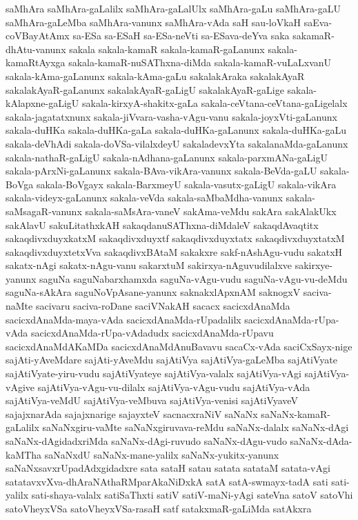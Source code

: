{saMhAra
saMhAra-gaLalilx
saMhAra-gaLalUlx
saMhAra-gaLu
saMhAra-gaLU
saMhAra-gaLeMba
saMhAra-vanunx
saMhAra-vAda
saH
sau-loVkaH
saEva-coVBayAtAmx
sa-ESa
sa-ESaH
sa-ESa-neVti
sa-ESava-deYva
saka
sakamaR-dhAtu-vanunx
sakala
sakala-kamaR
sakala-kamaR-gaLanunx
sakala-kamaRtAyxga
sakala-kamaR-nuSAThxna-diMda
sakala-kamaR-vuLaLxvanU
sakala-kAma-gaLanunx
sakala-kAma-gaLu
sakalakAraka
sakalakAyaR
sakalakAyaR-gaLanunx
sakalakAyaR-gaLigU
sakalakAyaR-gaLige
sakala-kAlapxne-gaLigU
sakala-kirxyA-shakitx-gaLa
sakala-ceVtana-ceVtana-gaLigelalx
sakala-jagatatxnunx
sakala-jiVvara-vasha-vAgu-vanu
sakala-joyxVti-gaLanunx
sakala-duHKa
sakala-duHKa-gaLa
sakala-duHKa-gaLanunx
sakala-duHKa-gaLu
sakala-deVhAdi
sakala-doVSa-vilalxdeyU
sakaladevxYta
sakalanaMda-gaLanunx
sakala-nathaR-gaLigU
sakala-nAdhana-gaLanunx
sakala-parxmANa-gaLigU
sakala-pArxNi-gaLanunx
sakala-BAva-vikAra-vanunx
sakala-BeVda-gaLU
sakala-BoVga
sakala-BoVgayx
sakala-BarxmeyU
sakala-vasutx-gaLigU
sakala-vikAra
sakala-videyx-gaLanunx
sakala-veVda
sakala-saMbaMdha-vanunx
sakala-saMsagaR-vanunx
sakala-saMsAra-vaneV
sakAma-veMdu
sakAra
sakAlakUkx
sakAlavU
sakuLitathxkAH
sakaqdanuSAThxna-diMdaleV
sakaqdAvaqtitx
sakaqdivxduyxkatxM
sakaqdivxduyxtf
sakaqdivxduyxtatx
sakaqdivxduyxtatxM
sakaqdivxduyxtetxVva
sakaqdivxBAtaM
sakakxre
sakf-nAshAgu-vudu
sakatxH
sakatx-nAgi
sakatx-nAgu-vanu
sakarxtuM
sakirxya-nAguvudilalxve
sakirxye-yanunx
saguNa
saguNabarxhamxda
saguNa-vAgu-vudu
saguNa-vAgu-vu-deMdu
saguNa-sAkAra
saguNoVpAsane-yanunx
saknakxlApxnAM
saknogxV
saciva-naMte
sacivaru
saciva-roDane
saciVNakAH
sacacx
sacicxdAnaMda
sacicxdAnaMda-maya-vAda
sacicxdAnaMda-rUpadalilx
sacicxdAnaMda-rUpa-vAda
sacicxdAnaMda-rUpa-vAdadudx
sacicxdAnaMda-rUpavu
sacicxdAnaMdAKaMDa
sacicxdAnaMdAnuBavavu
sacaCx-vAda
saciCxSayx-nige
sajAti-yAveMdare
sajAti-yAveMdu
sajAtiVya
sajAtiVya-gaLeMba
sajAtiVyate
sajAtiVyate-yiru-vudu
sajAtiVyateye
sajAtiVya-valalx
sajAtiVya-vAgi
sajAtiVya-vAgive
sajAtiVya-vAgu-vu-dilalx
sajAtiVya-vAgu-vudu
sajAtiVya-vAda
sajAtiVya-veMdU
sajAtiVya-veMbuva
sajAtiVya-venisi
sajAtiVyaveV
sajajxnarAda
sajajxnarige
sajayxteV
sacnacxraNiV
saNaNx
saNaNx-kamaR-gaLalilx
saNaNxgiru-vaMte
saNaNxgiruvava-reMdu
saNaNx-dalalx
saNaNx-dAgi
saNaNx-dAgidadxriMda
saNaNx-dAgi-ruvudo
saNaNx-dAgu-vudo
saNaNx-dAda-kaMTha
saNaNxdU
saNaNx-mane-yalilx
saNaNx-yukitx-yanunx
saNaNxsavxrUpadAdxgidadxre
sata
sataH
satau
satata
satataM
satata-vAgi
satatavxvXva-dhAraNAthaRMparAkaNiDxkA
satA
satA-swmayx-tadA
sati
sati-yalilx
sati-shaya-valalx
satiSaThxti
satiV
satiV-maNi-yAgi
sateVna
satoV
satoVhi
satoVheyxVSa
satoVheyxVSa-rasaH
satf
satakxmaR-gaLiMda
satAkxra
}
